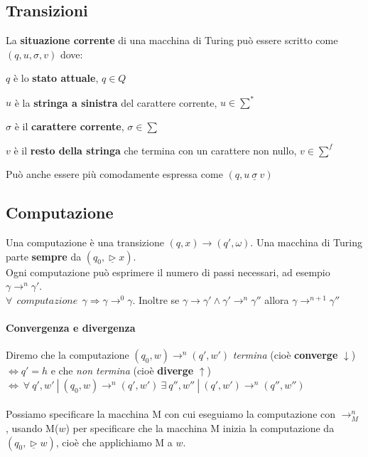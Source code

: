 \documentclass[10pt]{book}
\begin{document}
\subsection{Transizioni}
La \textbf{situazione corrente} di una macchina di Turing può essere scritto come $(q, u, \sigma, v)$ dove:
\begin{list}{}{}
	\item $q$ è lo \textbf{stato attuale}, $q \in Q$
	\item $u$ è la \textbf{stringa a sinistra} del carattere corrente, $u \in \sum^*$
	\item $\sigma$ è il \textbf{carattere corrente}, $\sigma \in \sum$
	\item $v$ è il \textbf{resto della stringa} che termina con un carattere non nullo, $v \in \sum^f$
\end{list}
Può anche essere più comodamente espressa come $(q, u \:\underline{\sigma}\: v)$

\subsection{Computazione}
Una computazione è una transizione $(q, x) \longrightarrow (q', \omega)$. Una macchina di Turing parte \textbf{sempre} da $(q_0, \underline{\triangleright} x)$.\\
Ogni computazione può esprimere il numero di passi necessari, ad esempio $\gamma \longrightarrow^n \gamma'$.\\
$\forall \:\:computazione\:\: \gamma \Rightarrow \gamma \longrightarrow^0 \gamma$. Inoltre se $\gamma \longrightarrow \gamma' \wedge \gamma' \longrightarrow^n \gamma''$ allora $\gamma \longrightarrow^{n+1} \gamma''$
\paragraph{Convergenza e divergenza} Diremo che la computazione $(q_0, w)\rightarrow^n(q',w')$ \textit{termina} (cioè \textbf{converge} $\downarrow$) $\Leftrightarrow q' = h$ e che \textit{non termina} (cioè \textbf{diverge} $\uparrow$) $\Leftrightarrow\:\forall\:q', w'\:|\:(q_0, w) \rightarrow^n (q', w')\:\exists\: q'', w''\:|\:(q', w')\rightarrow^n(q'', w'')$\\\\
Possiamo specificare la macchina M con cui eseguiamo la computazione con $\rightarrow^n_M$, usando M($w$) per specificare che la macchina M inizia la computazione da $(q_0,\underline{\triangleright}w)$, cioè che applichiamo M a $w$.
\end{document}
